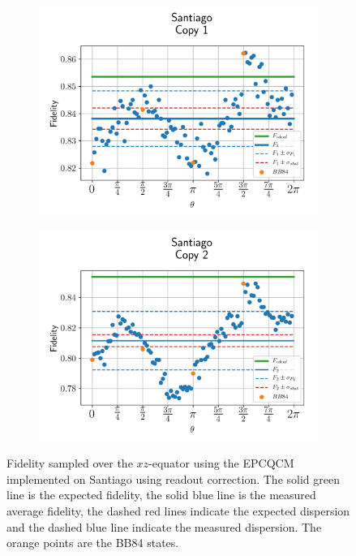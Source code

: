 \begin{figure}[H]
  \centering
  \begin{subfigure}{.5\textwidth}
    \centering
    \includegraphics[width=\textwidth]{Figures/Economical/IBM/OnlyEquator/results_corrected_santiago_copy1.png}
    \label{fig:epc_corrected_santiago_equator_1}
  \end{subfigure}%
  \begin{subfigure}{.5\textwidth}
    \centering
    \includegraphics[width=\textwidth]{Figures/Economical/IBM/OnlyEquator/results_corrected_santiago_copy2.png}
    \label{fig:epc_corrected_santiago_equator_2}
  \end{subfigure}
  \vspace{-0.5cm}
  \caption{Fidelity sampled over the $xz$-equator using the EPCQCM implemented on Santiago using readout correction. The solid green line is the expected fidelity, the solid blue line is the measured average fidelity, the dashed red lines indicate the expected dispersion and the dashed blue line indicate the measured dispersion. The orange points are the BB84 states.}
  \label{fig:epc_corrected_santiago_equator}
\end{figure}

